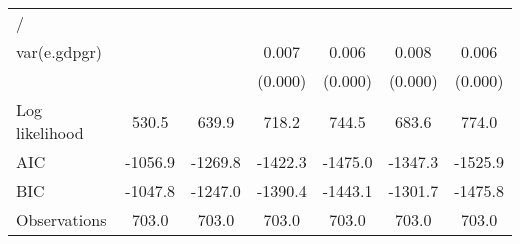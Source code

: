 \begin{table}[htbp]
\begin{tabular}{l*{6}{c}}
\hline
/                   &                     &                     &                     &                     &                     &                     \\
var(e.gdpgr)        &                     &                     &       0.007\sym{***}&       0.006\sym{***}&       0.008\sym{***}&       0.006\sym{***}\\
                    &                     &                     &     (0.000)         &     (0.000)         &     (0.000)         &     (0.000)         \\
\hline
Log likelihood      &       530.5         &       639.9         &       718.2         &       744.5         &       683.6         &       774.0         \\
AIC                 &     -1056.9         &     -1269.8         &     -1422.3         &     -1475.0         &     -1347.3         &     -1525.9         \\
BIC                 &     -1047.8         &     -1247.0         &     -1390.4         &     -1443.1         &     -1301.7         &     -1475.8         \\
Observations        &       703.0         &       703.0         &       703.0         &       703.0         &       703.0         &       703.0         \\
\hline\hline
\end{tabular}
\end{table}
